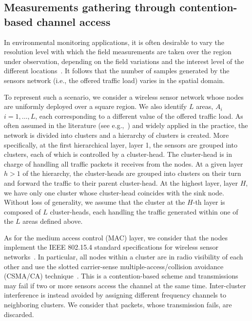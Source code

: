 \documentclass[11pt, draftcls, onecolumn, a4paper]{IEEEtran}
\begin{document}
\subsection{Measurements gathering through contention-based channel access}

In environmental monitoring applications, it is often desirable to vary
the resolution level with which the field measurements are taken
over the region under observation, depending on the field variations and 
the interest level of the different locations~\cite{Perillo04,Willett04}. 
It follows that the number of samples generated by the sensors network 
(i.e., the offered traffic load)  varies in the spatial 
domain. 
 
To represent such a scenario,  we consider a wireless sensor network 
whose nodes are uniformly deployed over a square region. 
We also identify $L$ areas, $A_i$ $i=1,\ldots,L$,
each corresponding to a different value of the offered traffic load.
As often assumed in the literature (see e.g.,~\cite{cluster,clusterH})
and widely applied in the practice, 
the network is divided into clusters
and a hierarchy of clusters is created. 
More specifically, at the first hierarchical layer, layer 1, the sensors 
are grouped into clusters, each of which is 
controlled by a cluster-head. 
The cluster-head is in charge of handling all traffic 
packets it receives from the nodes.
At a given layer $h>1$ of the hierarchy, 
the cluster-heads are grouped into clusters on their turn and 
forward the traffic to their parent cluster-head.
At the highest layer, layer $H$, we have only one cluster whose 
cluster-head coincides with the sink node.
Without loss of generality, we assume that the cluster at the $H$-th layer 
is composed of $L$ cluster-heads, each handling the traffic 
generated within one of the $L$ areas defined above.

As for the medium access control (MAC) layer, we consider that the nodes
implement the IEEE 802.15.4 standard 
specifications for wireless sensor networks~\cite{802.15.4}. 
In particular, all nodes  within a cluster are in radio visibility 
of each other and use the  slotted
carrier-sense multiple-access/collision avoidance  
 (CSMA/CA) technique~\cite{802.15.4}. This is a contention-based scheme 
and transmissions may fail if two or more sensors
access the channel at the same time. Inter-cluster interference 
is instead avoided by assigning  different frequency 
channels to neighboring clusters. 
We consider that packets, whose transmission fails, are discarded.
\end{document}

